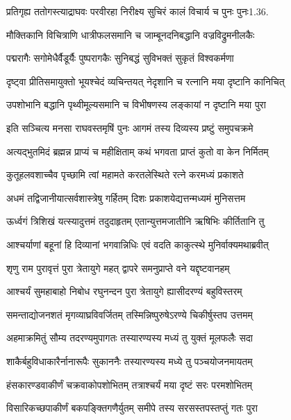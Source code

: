 \twolineshloka
{प्रतिगृह्य ततोगस्त्याद्राघवः परवीरहा}
{निरीक्ष्य सुचिरं कालं विचार्य च पुनः पुनः1.36.}%

\twolineshloka
{मौक्तिकानि विचित्राणि धात्रीफलसमानि च}
{जाम्बूनदनिबद्धानि वज्रविद्रुमनीलकैः}%

\twolineshloka
{पद्मरागैः सगोमेधैर्वैडूर्यैः पुष्परागकैः}
{सुनिबद्धं सुविभक्तं सुकृतं विश्वकर्मणा}%

\twolineshloka
{दृष्ट्वा प्रीतिसमायुक्तो भूयश्चेदं व्यचिन्तयत्}
{नेदृशानि च रत्नानि मया दृष्टानि कानिचित्}%

\twolineshloka
{उपशोभानि बद्धानि पृथ्वीमूल्यसमानि च}
{विभीषणस्य लङ्कायां न दृष्टानि मया पुरा}%

\twolineshloka
{इति सञ्चित्य मनसा राघवस्तमृषिं पुनः}
{आगमं तस्य दिव्यस्य प्रष्टुं समुपचक्रमे}%

\twolineshloka
{अत्यद्भुतमिदं ब्रह्मन्न प्राप्यं च महीक्षिताम्}
{कथं भगवता प्राप्तं कुतो वा केन निर्मितम्}%

\twolineshloka
{कुतूहलवशाच्चैव पृच्छामि त्वां महामते}
{करतलेस्थिते रत्ने करमध्यं प्रकाशते}%

\twolineshloka
{अधमं तद्विजानीयात्सर्वशास्त्रेषु गर्हितम्}
{दिशः प्रकाशयेद्यत्तन्मध्यमं मुनिसत्तम}%

\twolineshloka
{ऊर्ध्वगं त्रिशिखं यत्स्यादुत्तमं तदुदाहृतम्}
{एतान्युत्तमजातीनि ऋषिभिः कीर्तितानि तु}%

\twolineshloka
{आश्चर्याणां बहूनां हि दिव्यानां भगवान्निधिः}
{एवं वदति काकुत्स्थे मुनिर्वाक्यमथाब्रवीत्}%


\twolineshloka
{शृणु राम पुरावृत्तं पुरा त्रेतायुगे महत्}
{द्वापरे समनुप्राप्ते वने यद्दृष्टवानहम्}%

\twolineshloka
{आश्चर्यं सुमहाबाहो निबोध रघुनन्दन}
{पुरा त्रेतायुगे ह्यासीदरण्यं बहुविस्तरम्}%

\twolineshloka
{समन्ताद्योजनशतं मृगव्याघ्रविवर्जितम्}
{तस्मिन्निष्पुरुषेऽरण्ये चिकीर्षुस्तप उत्तमम्}%

\twolineshloka
{अहमाक्रमितुं सौम्य तदरण्यमुपागतः}
{तस्यारण्यस्य मध्यं तु युक्तं मूलफलैः सदा}%

\twolineshloka
{शाकैर्बहुविधाकारैर्नानारूपैः सुकाननैः}
{तस्यारण्यस्य मध्ये तु पञ्चयोजनमायतम्}%

\twolineshloka
{हंसकारण्डवाकीर्णं चक्रवाकोपशोभितम्}
{तत्राश्चर्यं मया दृष्टं सरः परमशोभितम्}%

\twolineshloka
{विसारिकच्छपाकीर्णं बकपङ्क्तिगणैर्युतम्}
{समीपे तस्य सरसस्तपस्तप्तुं गतः पुरा}%

